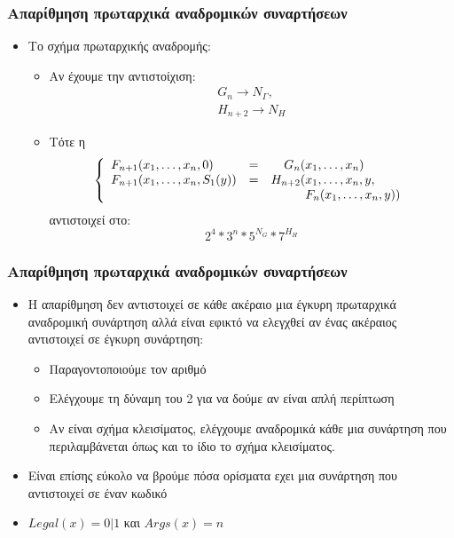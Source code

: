 \documentclass{beamer}
\begin{document}
\begin{frame}
        \frametitle{Απαρίθμηση πρωταρχικά αναδρομικών συναρτήσεων}
        \begin{itemize}
                \item Το σχήμα πρωταρχικής αναδρομής:
                \begin{itemize}
                        \item Αν έχουμε την αντιστοίχιση:
                        $$\begin{array}{l}
                            G_n \rightarrow N_Γ,\\
                            H_{n+2} \rightarrow N_H
                        \end{array}$$
                \pause
                        \item Τότε η 
                        $$\left\{
                            \begin{array}{llr@{}l}
                              F_{n+1}(x_1,\ldots,x_n, 0)     &=&    G_n(&x_1,\ldots,x_n) \\
                              F_{n+1}(x_1,\ldots,x_n, S_1(y))&=&H_{n+2}(&x_1,\ldots,x_n, y ,\\
                                                             & &        &F_n(x_1,\ldots,x_n, y))
                            \end{array}
                        \right.$$
                        αντιστοιχεί στο:
                        $$ 2^4*3^n*5^{N_G}*7^{H_H} $$
                \end{itemize}                   
        \end{itemize}
\end{frame}

\begin{frame}
        \frametitle{Απαρίθμηση πρωταρχικά αναδρομικών συναρτήσεων}
        \begin{itemize}
                \item Η απαρίθμηση δεν αντιστοιχεί σε κάθε ακέραιο μια έγκυρη
                πρωταρχικά αναδρομική συνάρτηση αλλά είναι εφικτό να ελεγχθεί αν
                ένας ακέραιος αντιστοιχεί σε έγκυρη συνάρτηση:
                \pause
                \begin{itemize}
                        \item Παραγοντοποιούμε τον αριθμό
                \pause
                        \item Ελέγχουμε τη δύναμη του 2 για να δούμε αν είναι απλή περίπτωση
                \pause
                        \item Αν είναι σχήμα κλεισίματος, ελέγχουμε αναδρομικά κάθε μια συνάρτηση
                        που περιλαμβάνεται όπως και το ίδιο το σχήμα κλεισίματος.
                \end{itemize}
                \pause
                \item Είναι επίσης εύκολο να βρούμε πόσα ορίσματα εχει μια συνάρτηση που αντιστοιχεί σε έναν κωδικό
                \pause
                \item $Legal(x)=0|1$ και $Args(x)=n$
        \end{itemize}
\end{frame}
\end{document}
